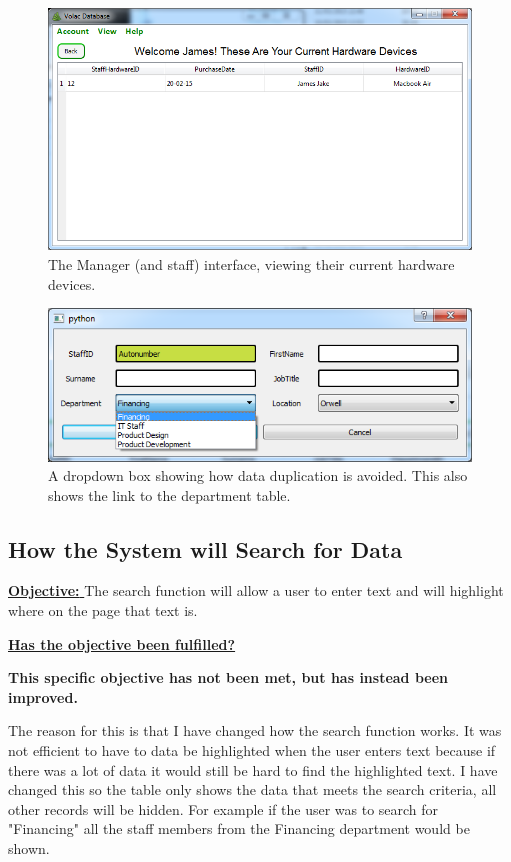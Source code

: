 \begin{figure}[H]
    \includegraphics[width=\textwidth]{./Evaluation/Images/database2.png}
    \caption{The Manager (and staff) interface, viewing their current hardware devices.} \label{fig:db3}
\end{figure}

\begin{figure}[H]
    \includegraphics[width=\textwidth]{./Evaluation/Images/dropdown.png}
    \caption{A dropdown box showing how data duplication is avoided. This also shows the link to the department table.} 
\end{figure}



\subsection{How the System will Search for Data}

\underline{\textbf{Objective:} } The search function will allow a user to enter text and will highlight where on the page that text is.

\underline{\textbf{Has the objective been fulfilled?}}

\textbf{This specific objective has not been met, but has instead been improved.}

The reason for this is that I have changed how the search function works. It was not efficient to have to data be highlighted when the user enters text because if there was a lot of data it would still be hard to find the highlighted text. I have changed this so the table only shows the data that meets the search criteria, all other records will be hidden. For example if the user was to search for "Financing" all the staff members from the Financing department would be shown.

